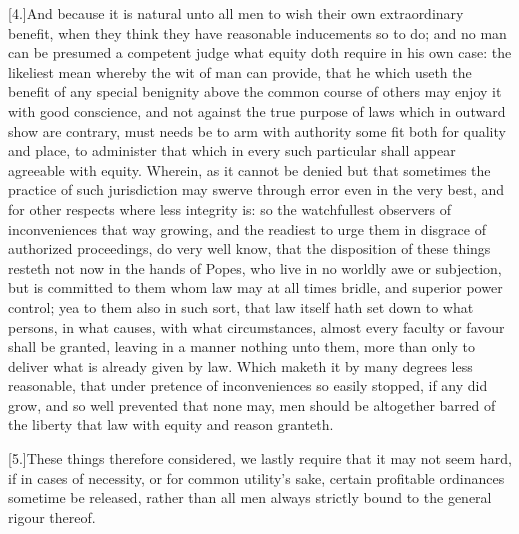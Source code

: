 [4.]And because it is natural unto all men to wish their own extraordinary benefit, when they think they have reasonable inducements so to do; and no man can be presumed a competent judge what equity doth require in his own case: the likeliest mean whereby the wit of man can provide, that he which useth the benefit of any special benignity above the common course of others may enjoy it with good conscience, and not against the true purpose of laws which in outward show are contrary, must needs be to arm with authority some fit both for quality and place, to administer that which in every such particular shall appear agreeable with equity. Wherein, as it cannot be denied but that sometimes the practice of such jurisdiction may swerve through error even in the very best, and for other respects where less integrity is: so the watchfullest observers of inconveniences that way growing, and the readiest to urge them in disgrace of authorized proceedings, do very well know, that the disposition of these things resteth not now in the hands of Popes, who live in no worldly awe or subjection, but is committed to them whom law may at all times bridle, and superior power control; yea to them also in such sort, that law itself hath set down to what persons, in what causes, with what circumstances, almost every faculty or favour shall be granted, leaving in a manner nothing unto them, more than only to deliver what is already given by law. Which maketh it by many degrees less reasonable, that under pretence of inconveniences so easily stopped, if any did grow, and so well prevented that none may, men should be altogether barred of the liberty that law with equity and reason granteth.

[5.]These things therefore considered, we lastly require that it may not seem hard, if in cases of necessity, or for common utility’s sake, certain profitable ordinances sometime  be released, rather than all men always strictly bound to the general rigour thereof.


